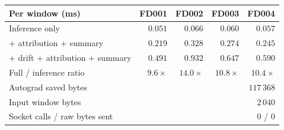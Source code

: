\begin{tabular}{@{}lrrrr@{}}
\toprule
Per window (ms) & FD001 & FD002 & FD003 & FD004 \\
\midrule
Inference only & $0.051$ & $0.066$ & $0.060$ & $0.057$ \\
+ attribution + summary & $0.219$ & $0.328$ & $0.274$ & $0.245$ \\
+ drift + attribution + summary & $0.491$ & $0.932$ & $0.647$ & $0.590$ \\
Full / inference ratio & $9.6\times$ & $14.0\times$ & $10.8\times$ & $10.4\times$ \\
\midrule
Autograd saved bytes & \multicolumn{4}{r}{$117\,368$} \\
Input window bytes & \multicolumn{4}{r}{$2\,040$} \\
Socket calls / raw bytes sent & \multicolumn{4}{r}{$0$ / $0$} \\
\bottomrule
\end{tabular}
